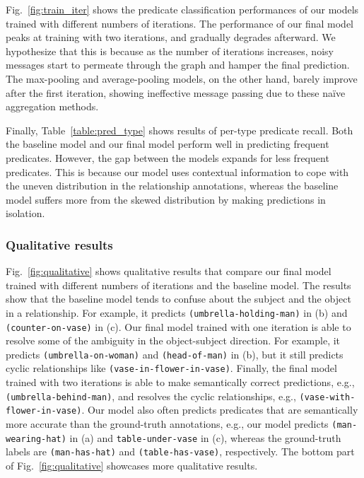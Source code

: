 \documentclass[10pt,twocolumn,letterpaper]{article}
\begin{document}
Fig.~\ref{fig:train_iter} shows the predicate classification performances of our models trained with different numbers of iterations. The performance of our final model peaks at training with two iterations, and gradually degrades afterward. We hypothesize that this is because as the number of iterations increases, noisy messages start to permeate through the graph and hamper the final prediction. The max-pooling and average-pooling models, on the other hand, barely improve after the first iteration, showing ineffective message passing due to these na\"{i}ve aggregation methods.

Finally, Table~\ref{table:pred_type} shows results of per-type predicate recall. Both the baseline model and our final model perform well in predicting frequent predicates. However, the gap between the models expands for less frequent predicates. This is because our model uses contextual information to cope with the uneven distribution in the relationship annotations, whereas the baseline model suffers more from the skewed distribution by making predictions in isolation.

\subsubsection{Qualitative results} 
Fig.~\ref{fig:qualitative} shows qualitative results that compare our final model trained with different numbers of iterations and the baseline model. The results show that the baseline model tends to confuse about the subject and the object in a relationship. For example, it predicts \texttt{(umbrella-holding-man)} in (b) and \texttt{(counter-on-vase)} in (c). Our final model trained with one iteration is able to resolve some of the ambiguity in the object-subject direction. For example, it predicts \texttt{(umbrella-on-woman)} and \texttt{(head-of-man)} in (b), but it still predicts cyclic relationships like \texttt{(vase-in-flower-in-vase)}. Finally, the final model trained with two iterations is able to make semantically correct predictions, e.g., \texttt{(umbrella-behind-man)}, and resolves the cyclic relationships, e.g., \texttt{(vase-with-flower-in-vase)}. Our model also often predicts predicates that are semantically more accurate than the ground-truth annotations, e.g., our model predicts \texttt{(man-wearing-hat)} in (a) and \texttt{table-under-vase} in (c), whereas the ground-truth labels are \texttt{(man-has-hat)} and \texttt{(table-has-vase)}, respectively. The bottom part of Fig.~\ref{fig:qualitative} showcases more qualitative results.
\end{document}
